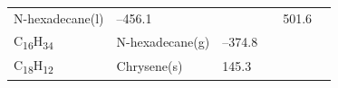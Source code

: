 \documentclass[
]{book}
\theoremstyle{definition}
\theoremstyle{definition}
\theoremstyle{definition}
\theoremstyle{remark}
\begin{document}
\begin{longtable}[]{@{}llllll@{}}
\begin{minipage}[t]{0.17\columnwidth}
N-hexadecane(l)\strut
\end{minipage} & \begin{minipage}[t]{0.15\columnwidth}\raggedright
--456.1\strut
\end{minipage} & \begin{minipage}[t]{0.15\columnwidth}\raggedright
\strut
\end{minipage} & \begin{minipage}[t]{0.14\columnwidth}\raggedright
\strut
\end{minipage} & \begin{minipage}[t]{0.14\columnwidth}\raggedright
501.6\strut
\end{minipage}\tabularnewline
\begin{minipage}[t]{0.07\columnwidth}\raggedright
C\textsubscript{16}H\textsubscript{34}\strut
\end{minipage} & \begin{minipage}[t]{0.17\columnwidth}\raggedright
N-hexadecane(g)\strut
\end{minipage} & \begin{minipage}[t]{0.15\columnwidth}\raggedright
--374.8\strut
\end{minipage} & \begin{minipage}[t]{0.15\columnwidth}\raggedright
\strut
\end{minipage} & \begin{minipage}[t]{0.14\columnwidth}\raggedright
\strut
\end{minipage} & \begin{minipage}[t]{0.14\columnwidth}\raggedright
\strut
\end{minipage}\tabularnewline
\begin{minipage}[t]{0.07\columnwidth}\raggedright
C\textsubscript{18}H\textsubscript{12}\strut
\end{minipage} & \begin{minipage}[t]{0.17\columnwidth}\raggedright
Chrysene(s)\strut
\end{minipage} & \begin{minipage}[t]{0.15\columnwidth}\raggedright
145.3\strut
\end{minipage} & \begin{minipage}[t]{0.15\columnwidth}\raggedright
\strut
\end{minipage} & \begin{minipage}[t]{0.14\columnwidth}\raggedright
\strut
\end{minipage} & \begin{minipage}[t]{0.14\columnwidth}\raggedright

\end{minipage}
\end{longtable}
\end{document}
